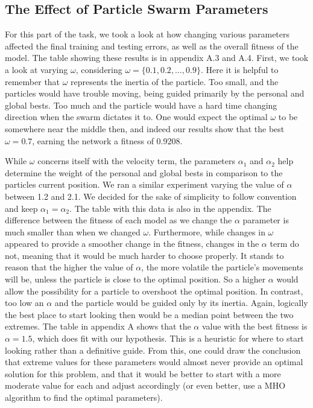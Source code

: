 \documentclass[12pt]{article}
\begin{document}
\subsection{The Effect of Particle Swarm Parameters}
For this part of the task, we took a look at how changing various parameters affected the final training and testing errors, as well as the overall fitness of the model. The table showing these results is in appendix A.3 and A.4.
First, we took a look at varying $\omega$, considering $\omega = \{0.1, 0.2, \ldots, 0.9\}$. Here it is helpful to remember that $\omega$ represents the inertia of the particle. Too small, and the particles would have trouble moving, being guided primarily by the personal and global bests. Too much and the particle would have a hard time changing direction when the swarm dictates it to. One would expect the optimal $\omega$ to be somewhere near the middle then, and indeed our results show that the best $\omega = 0.7$, earning the network a fitness of 0.9208. 

While $\omega$ concerns itself with the velocity term, the parameters $\alpha_1$ and $\alpha_2$ help determine the weight of the personal and global bests in comparison to the particles current position.
We ran a similar experiment varying the value of $\alpha$ between 1.2 and 2.1. We decided for the sake of simplicity to follow convention and keep $\alpha_1=\alpha_2$. The table with this data is also in the appendix. The difference between the fitness of each model as we change the $\alpha$ parameter is much smaller than when we changed $\omega$. Furthermore, while changes in $\omega$ appeared to provide a smoother change in the fitness, changes in the $\alpha$ term do not, meaning that it would be much harder to choose properly. It stands to reason that the higher the value of $\alpha$, the more volatile the particle's movements will be, unless the particle is close to the optimal position. So a higher $\alpha$ would allow the possibility for a particle to overshoot the optimal position. In contrast, too low an $\alpha$ and the particle would be guided only by its inertia. Again, logically the best place to start looking then would be a median point between the two extremes. The table in appendix A shows that the $\alpha$ value with the best fitness is $\alpha=1.5$, which does fit with our hypothesis. This is a heuristic for where to start looking rather than a definitive guide. From this, one could draw the conclusion that extreme values for these parameters would almost never provide an optimal solution for this problem, and that it would be better to start with a more moderate value for each and adjust accordingly (or even better, use a MHO algorithm to find the optimal parameters).
\end{document}
